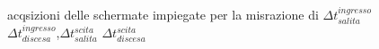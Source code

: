 \begin{figure}[hb]
{	}
	\\

		\caption{acqsizioni delle schermate impiegate per la misrazione di $\Delta t_{salita}^{ingresso}$ $\Delta t_{discesa}^{ingresso}$,$\Delta t_{salita}^{scita}$ $\Delta t_{discesa}^{scita}$ }
		\label{f:sd}
	\end{figure}
